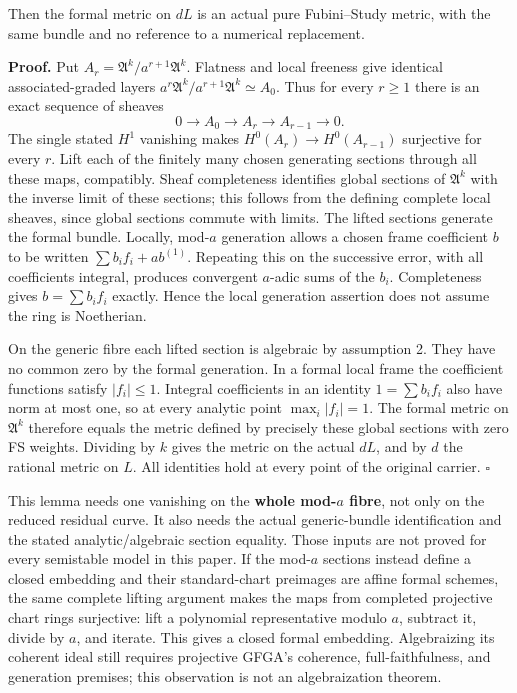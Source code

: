 \documentclass[
  11pt,
]{article}
\begin{document}
Then the formal metric on \(dL\) is an actual pure Fubini--Study metric,
with the same bundle and no reference to a numerical replacement.

\textbf{Proof.} Put \(A_r=\mathfrak A^k/a^{r+1}\mathfrak A^k\). Flatness
and local freeness give identical associated-graded layers
\(a^r\mathfrak A^k/a^{r+1}\mathfrak A^k\simeq A_0\). Thus for every
\(r\geq1\) there is an exact sequence of sheaves \[
 0\longrightarrow A_0\longrightarrow A_r\longrightarrow A_{r-1}\longrightarrow0.
\] The single stated \(H^1\) vanishing makes
\(H^0(A_r)\to H^0(A_{r-1})\) surjective for every \(r\). Lift each of
the finitely many chosen generating sections through all these maps,
compatibly. Sheaf completeness identifies global sections of
\(\mathfrak A^k\) with the inverse limit of these sections; this follows
from the defining complete local sheaves, since global sections commute
with limits. The lifted sections generate the formal bundle. Locally,
mod-\(a\) generation allows a chosen frame coefficient \(b\) to be
written \(\sum b_if_i+a b^{(1)}\). Repeating this on the successive
error, with all coefficients integral, produces convergent \(a\)-adic
sums of the \(b_i\). Completeness gives \(b=\sum b_if_i\) exactly. Hence
the local generation assertion does not assume the ring is Noetherian.

On the generic fibre each lifted section is algebraic by assumption 2.
They have no common zero by the formal generation. In a formal local
frame the coefficient functions satisfy \(|f_i|\leq1\). Integral
coefficients in an identity \(1=\sum b_if_i\) also have norm at most
one, so at every analytic point \(\max_i|f_i|=1\). The formal metric on
\(\mathfrak A^k\) therefore equals the metric defined by precisely these
global sections with zero FS weights. Dividing by \(k\) gives the metric
on the actual \(dL\), and by \(d\) the rational metric on \(L\). All
identities hold at every point of the original carrier. \(\square\)

This lemma needs one vanishing on the \textbf{whole mod-\(a\) fibre},
not only on the reduced residual curve. It also needs the actual
generic-bundle identification and the stated analytic/algebraic section
equality. Those inputs are not proved for every semistable model in this
paper. If the mod-\(a\) sections instead define a closed embedding and
their standard-chart preimages are affine formal schemes, the same
complete lifting argument makes the maps from completed projective chart
rings surjective: lift a polynomial representative modulo \(a\),
subtract it, divide by \(a\), and iterate. This gives a closed formal
embedding. Algebraizing its coherent ideal still requires projective
GFGA's coherence, full-faithfulness, and generation premises; this
observation is not an algebraization theorem.
\end{document}
